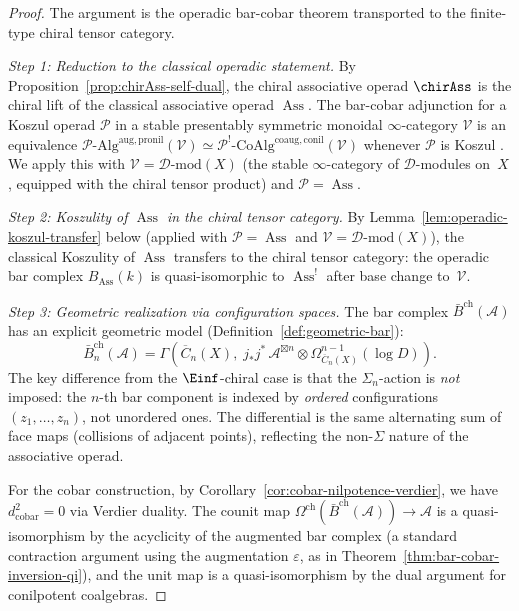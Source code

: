 \begin{proof}
The argument is the operadic bar-cobar theorem transported to the
finite-type chiral tensor category.

\emph{Step 1: Reduction to the classical operadic statement.}
By Proposition~\ref{prop:chirAss-self-dual}, the chiral associative
operad $\chirAss$ is the chiral lift of the classical associative
operad $\operatorname{Ass}$. The bar-cobar adjunction for a Koszul
operad $\mathcal{P}$ in a stable presentably symmetric monoidal
$\infty$-category $\mathcal{V}$ is an equivalence
$\mathcal{P}\text{-Alg}^{\mathrm{aug,pronil}}(\mathcal{V})
\simeq
\mathcal{P}^!\text{-CoAlg}^{\mathrm{coaug,conil}}(\mathcal{V})$
whenever $\mathcal{P}$ is Koszul \cite[Theorem~11.4.1]{LV12}.
We apply this with $\mathcal{V} = \mathcal{D}\text{-mod}(X)$
(the stable $\infty$-category of $\mathcal{D}$-modules on~$X$,
equipped with the chiral tensor product) and
$\mathcal{P} = \operatorname{Ass}$.

\emph{Step 2: Koszulity of $\operatorname{Ass}$ in the chiral
tensor category.}
By Lemma~\ref{lem:operadic-koszul-transfer} below
(applied with $\mathcal{P} = \operatorname{Ass}$ and
$\mathcal{V} = \mathcal{D}\text{-mod}(X)$),
the classical Koszulity of
$\operatorname{Ass}$ \cite[Theorem~7.4.1]{LV12} transfers to the
chiral tensor category: the operadic bar complex
$B_{\operatorname{Ass}}(k)$ is quasi-isomorphic to
$\operatorname{Ass}^!$ after base change to~$\mathcal{V}$.

\emph{Step 3: Geometric realization via configuration spaces.}
The bar complex $\bar{B}^{\mathrm{ch}}(\mathcal{A})$ has an
explicit geometric model (Definition~\ref{def:geometric-bar}):
\[
\bar{B}^{\mathrm{ch}}_n(\mathcal{A})
= \Gamma\!\left(\overline{C}_n(X),\;
j_* j^*\, \mathcal{A}^{\boxtimes n}
\otimes \Omega^{n-1}_{\overline{C}_n(X)}(\log D)\right).
\]
The key difference from the $\Einf$-chiral case is that the
$\Sigma_n$-action is \emph{not} imposed: the $n$-th bar component
is indexed by \emph{ordered} configurations $(z_1, \ldots, z_n)$,
not unordered ones. The differential is the same alternating sum of
face maps (collisions of adjacent points), reflecting the
non-$\Sigma$ nature of the associative operad.

For the cobar construction, by
Corollary~\ref{cor:cobar-nilpotence-verdier}, we have
$d_{\mathrm{cobar}}^2 = 0$ via Verdier duality. The counit map
$\Omega^{\mathrm{ch}}(\bar{B}^{\mathrm{ch}}(\mathcal{A}))
\to \mathcal{A}$ is a quasi-isomorphism by the acyclicity of the
augmented bar complex (a standard contraction argument using the
augmentation $\varepsilon$, as in
Theorem~\ref{thm:bar-cobar-inversion-qi}), and the unit map is a
quasi-isomorphism by the dual argument for conilpotent coalgebras.
\end{proof}

